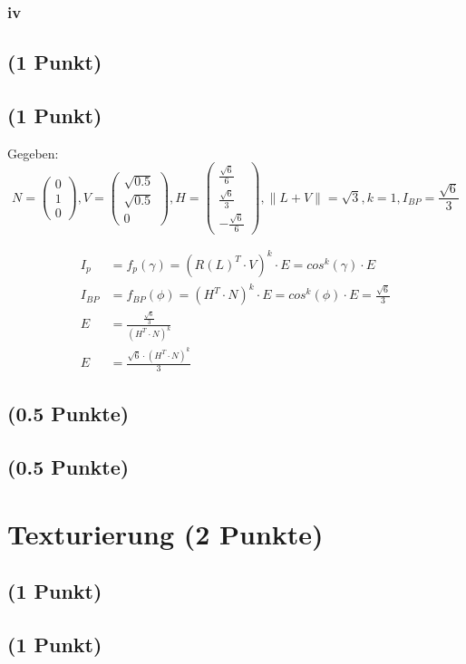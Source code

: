 \documentclass[a4paper,10pt,DIV=14]{article}
\begin{document}
\subsubsection{iv}

\subsection{(1 Punkt)}

\subsection{(1 Punkt)}%
\newcommand{\VecThree}[3]{\begin{pmatrix} #1 \\ #2 \\ #3 \end{pmatrix}}
Gegeben:
\[
N = \VecThree{0}{1}{0}, V = \VecThree{\sqrt{0.5}}{\sqrt{0.5}}{0}, H = \VecThree{\frac{\sqrt{6}}{6}}{\frac{\sqrt{6}}{3}}{-\frac{\sqrt{6}}{6}}, \lVert L+V \rVert = \sqrt{3}, k = 1, I_{BP} = \frac{\sqrt{6}}{3}
\]

\begin{align*}
I_p &= f_p(\gamma) = (R(L)^T \cdot V)^k \cdot E = cos^k(\gamma) \cdot E \\
I_{BP} &= f_{BP}(\phi) = (H^T \cdot N)^k \cdot E = cos^k(\phi) \cdot E = \frac{\sqrt{6}}{3} \\
E &= \frac{\frac{\sqrt{6}}{3}}{(H^T \cdot N)^k} \\
E &= \frac{\sqrt{6} \cdot (H^T \cdot N)^k}{3}
\end{align*}

\subsection{(0.5 Punkte)}

\subsection{(0.5 Punkte)}

\section{Texturierung (2 Punkte)}

\subsection{(1 Punkt)}

\subsection{(1 Punkt)} 
\end{document}
